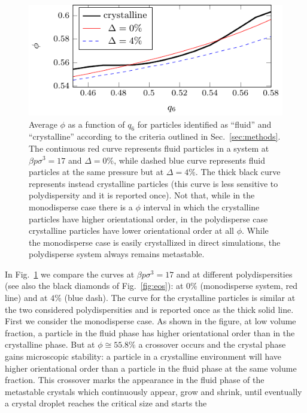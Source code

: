\documentclass[twocolumn,superscriptaddress]{revtex4}
\begin{document}
\begin{figure}
 \centering
 \includegraphics{fig_stability_map}
 \caption{Average $\phi$ as a function of $q_6$ for particles identified as ``fluid'' and ``crystalline'' according to the criteria outlined in Sec.~\ref{sec:methods}. The continuous red curve represents fluid particles in a system at $\beta p\sigma^3=17$ and $\Delta=0\%$, while dashed blue curve represents fluid particles at the same pressure but at $\Delta=4\%$. The thick black curve represents instead crystalline particles (this curve is less sensitive to polydispersity and it is reported once).
 Not that, while in the monodisperse case there is a $\phi$ interval in which the crystalline particles have higher orientational order, in the polydisperse
 case crystalline particles have lower orientational order at all $\phi$. While the monodisperse case is easily crystallized in direct simulations, the polydisperse
 system always remains metastable.}
 \label{fig:stability_map}
\end{figure}
In Fig.~\ref{fig:stability_map}
we compare the curves at $\beta p\sigma^3=17$ and at different polydispersities (see also the black diamonds of Fig.~\ref{fig:eos}): 
at $0\%$ (monodisperse system, red line) and at $4\%$ (blue dash). The curve for the
crystalline particles is similar at the two considered polydispersities and is reported once
as the thick solid line. First we consider the monodisperse case. As shown in the figure,
at low volume fraction, a particle in the fluid phase has higher orientational order than in the crystalline phase.
But at $\phi\cong 55.8\%$ a crossover
occurs and the crystal phase gains microscopic stability: a particle in a crystalline environment will
have higher orientational order than a particle in the fluid phase at the same volume fraction.
This crossover marks the appearance in the fluid phase of the metastable crystals which continuously
appear, grow and shrink, until eventually a crystal droplet reaches the critical size and starts the
\end{document}
